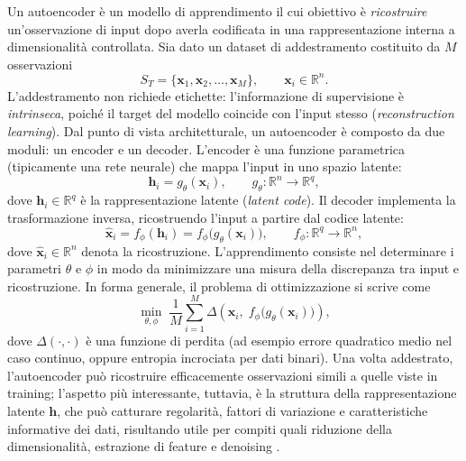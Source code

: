 Un autoencoder è un modello di apprendimento il cui obiettivo è
\textit{ricostruire} un’osservazione di input dopo averla codificata in una
rappresentazione interna a dimensionalità controllata. Sia dato un dataset di
addestramento costituito da $M$ osservazioni
\begin{equation}
    S_T = \{\mathbf{x}_1, \mathbf{x}_2, \dots, \mathbf{x}_M\}, 
    \qquad \mathbf{x}_i \in \mathbb{R}^n.
\end{equation}
L’addestramento non richiede etichette: l’informazione di supervisione è
\textit{intrinseca}, poiché il target del modello coincide con l’input stesso
(\textit{reconstruction learning}). Dal punto di vista architetturale, un autoencoder è composto da due moduli:
un encoder e un decoder. L’encoder è una funzione
parametrica (tipicamente una rete neurale) che mappa l’input in uno
spazio latente:
\begin{equation}
    \mathbf{h}_i = g_\theta(\mathbf{x}_i),
    \qquad g_\theta : \mathbb{R}^n \rightarrow \mathbb{R}^q,
\end{equation}
dove $\mathbf{h}_i \in \mathbb{R}^q$ è la rappresentazione latente
(\textit{latent code}). Il decoder implementa la trasformazione inversa,
ricostruendo l’input a partire dal codice latente:
\begin{equation}
    \hat{\mathbf{x}}_i = f_\phi(\mathbf{h}_i) = f_\phi\!\big(g_\theta(\mathbf{x}_i)\big),
    \qquad f_\phi : \mathbb{R}^q \rightarrow \mathbb{R}^n,
\end{equation}
dove $\hat{\mathbf{x}}_i \in \mathbb{R}^n$ denota la ricostruzione. L’apprendimento consiste nel determinare i parametri $\theta$ e $\phi$ in modo
da minimizzare una misura della discrepanza tra input e ricostruzione. In
forma generale, il problema di ottimizzazione si scrive come
\begin{equation}
    \min_{\theta,\phi}\;
    \frac{1}{M}\sum_{i=1}^{M}
    \Delta\!\left(\mathbf{x}_i,\; f_\phi\!\big(g_\theta(\mathbf{x}_i)\big)\right),
    \label{eq:ae_objective}
\end{equation}
dove $\Delta(\cdot,\cdot)$ è una funzione di perdita (ad esempio errore
quadratico medio nel caso continuo, oppure entropia incrociata per dati
binari). Una volta addestrato, l’autoencoder può ricostruire efficacemente
osservazioni simili a quelle viste in training; l’aspetto più interessante,
tuttavia, è la struttura della rappresentazione latente $\mathbf{h}$, che può
catturare regolarità, fattori di variazione e caratteristiche informative dei
dati, risultando utile per compiti quali riduzione della dimensionalità,
estrazione di feature e denoising \parencite{autoencodersbank2020autoencoders, michelucci2022introductionautoencoders}.
